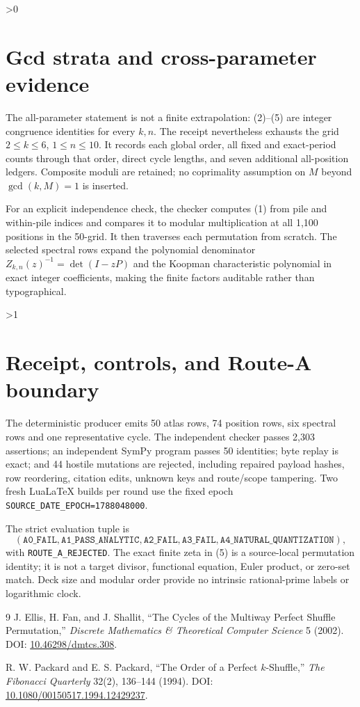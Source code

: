 \documentclass[10pt]{article}
\begin{document}
\ifnum\CRevisionRound>0
\section{Gcd strata and cross-parameter evidence}
The all-parameter statement is not a finite extrapolation: (2)--(5) are
integer congruence identities for every $k,n$.  The receipt nevertheless
exhausts the grid $2\le k\le6$, $1\le n\le10$.  It records each global order,
all fixed and exact-period counts through that order, direct cycle lengths,
and seven additional all-position ledgers.  Composite moduli are retained;
no coprimality assumption on $M$ beyond $\gcd(k,M)=1$ is inserted.

For an explicit independence check, the checker computes (1) from pile and
within-pile indices and compares it to modular multiplication at all 1,100
positions in the 50-grid.  It then traverses each permutation from scratch.
The selected spectral rows expand the polynomial denominator
$Z_{k,n}(z)^{-1}=\det(I-zP)$ and the Koopman characteristic polynomial in
exact integer coefficients, making the finite factors auditable rather than
typographical.
\fi

\ifnum\CRevisionRound>1
\section{Receipt, controls, and Route-A boundary}
The deterministic producer emits 50 atlas rows, 74 position rows, six
spectral rows and one representative cycle.  The independent checker passes
2,303 assertions; an independent SymPy program passes 50 identities; byte
replay is exact; and 44 hostile mutations are rejected, including repaired
payload hashes, row reordering, citation edits, unknown keys and route/scope
tampering.  Two fresh LuaLaTeX builds per round use the fixed epoch
\texttt{SOURCE\_DATE\_EPOCH=1788048000}.

The strict evaluation tuple is
\[
(\mathtt{A0\_FAIL},\mathtt{A1\_PASS\_ANALYTIC},\mathtt{A2\_FAIL},
 \mathtt{A3\_FAIL},\mathtt{A4\_NATURAL\_QUANTIZATION}),
\]
with \texttt{ROUTE\_A\_REJECTED}.  The exact finite zeta in (5) is a source-local
permutation identity; it is not a target divisor, functional equation,
Euler product, or zero-set match.  Deck size and modular order provide no
intrinsic rational-prime labels or logarithmic clock.
\fi

\begin{thebibliography}{9}
J. Ellis, H. Fan, and J. Shallit, ``The Cycles of the Multiway Perfect Shuffle
Permutation,'' \emph{Discrete Mathematics \& Theoretical Computer Science}
5 (2002). DOI:
\href{https://doi.org/10.46298/dmtcs.308}{10.46298/dmtcs.308}.

R. W. Packard and E. S. Packard, ``The Order of a Perfect $k$-Shuffle,''
\emph{The Fibonacci Quarterly} 32(2), 136--144 (1994). DOI:
\href{https://doi.org/10.1080/00150517.1994.12429237}{10.1080/00150517.1994.12429237}.
\end{thebibliography}
\end{document}
